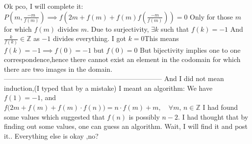 \begin{solution}
	Ok pco, I will complete it:
$ P\left(m,\frac{-m}{f(m)}\right)\implies f\left(2m+f(m)+f(m)f\left(\frac{-m}{f(m)}\right)\right)=0 $
Only for those $m$ for which $f(m)$ divides $m$.
Due to surjectivity, $\exists k$ such that $f(k)=-1$
And $\frac{k}{f(k)}\in\mathbb{Z}$ as $-1$ divides everything.
I got $k=0$This means $f(k)=-1\implies f(0)=-1$ but $f(0)=0$
But bijectivity implies one to one correspondence,hence there cannot exist an element in the codomain for which
there are two images in the domain.
---------------------------------------------------------------------
And I did not mean induction,(I typed that by a mistake)
I meant an algorithm:
We have $f(1)=-1$,
and $ f\big(2m+f(m)+f(m)\cdot f(n)\big)=n\cdot f(m)+m,\quad\forall m,\,n\in\mathbb{Z}$
I had found some values which suggested that $f(n)$ is possibly $n-2$.
I had thought that by finding out some values, one can guess an algorithm.
Wait, I will find it and post it..
Everything else is okay ,no?
\end{solution}



